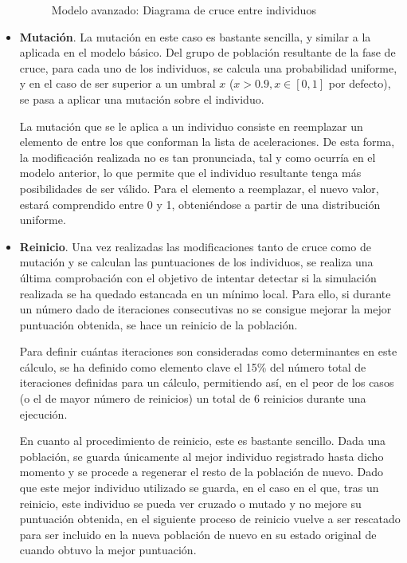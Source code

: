\documentclass[11pt,spanish,listoffigures,listoftables]{tfgetsinf}
\begin{document}
\begin{itemize}
\begin{figure}[ht]
\caption{Modelo avanzado: Diagrama de cruce entre individuos}
\end{figure}

    \item \textbf{Mutación}. La mutación en este caso es bastante sencilla, y similar a la aplicada en el modelo básico. Del grupo de población resultante de la fase de cruce, para cada uno de los individuos, se calcula una probabilidad uniforme, y en el caso de ser superior a un umbral $x$ ($x>0.9, x \in [0,1]$ por defecto), se pasa a aplicar una mutación sobre el individuo.
    
    La mutación que se le aplica a un individuo consiste en reemplazar un elemento de entre los que conforman la lista de aceleraciones. De esta forma, la modificación realizada no es tan pronunciada, tal y como ocurría en el modelo anterior, lo que permite que el individuo resultante tenga más posibilidades de ser válido. Para el elemento a reemplazar, el nuevo valor, estará comprendido entre 0 y 1, obteniéndose a partir de una distribución uniforme.
    
    \item \textbf{Reinicio}. Una vez realizadas las modificaciones tanto de cruce como de mutación y se calculan las puntuaciones de los individuos, se realiza una última comprobación con el objetivo de intentar detectar si la simulación realizada se ha quedado estancada en un mínimo local. Para ello, si durante un número dado de iteraciones consecutivas no se consigue mejorar la mejor puntuación obtenida, se hace un reinicio de la población.
    
    Para definir cuántas iteraciones son consideradas como determinantes en este cálculo, se ha definido como elemento clave el 15\% del número total de iteraciones definidas para un cálculo, permitiendo así, en el peor de los casos (o el de mayor número de reinicios) un total de 6 reinicios durante una ejecución.
    
    En cuanto al procedimiento de reinicio, este es bastante sencillo. Dada una población, se guarda únicamente al mejor individuo registrado hasta dicho momento y se procede a regenerar el resto de la población de nuevo. Dado que este mejor individuo utilizado se guarda, en el caso en el que, tras un reinicio, este individuo se pueda ver cruzado o mutado y no mejore su puntuación obtenida, en el siguiente proceso de reinicio vuelve a ser rescatado para ser incluido en la nueva población de nuevo en su estado original de cuando obtuvo la mejor puntuación.
\end{itemize}
\end{document}
